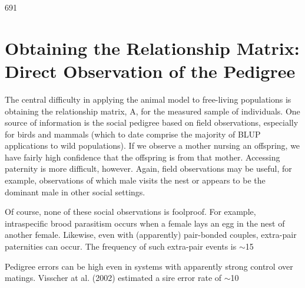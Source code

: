 \documentclass{article}
\begin{document}
691

\section{Obtaining the Relationship Matrix: Direct Observation of the Pedigree}
The central difficulty in applying the animal model to free-living populations is obtaining the relationship matrix, A, for the measured sample of individuals. One source of information is the social pedigree based on field observations, especially for birds and mammals (which to date comprise the majority of BLUP applications to wild populations). If we observe a mother nursing an offspring, we have fairly high confidence that the offspring is from that mother. Accessing paternity is more difficult, however. Again, field observations may be useful, for example, observations of which male visits the nest or appears to be the dominant male in other social settings.

Of course, none of these social observations is foolproof. For example, intraspecific brood parasitism occurs when a female lays an egg in the nest of another female. Likewise, even with (apparently) pair-bonded couples, extra-pair paternities can occur. The frequency of such extra-pair events is  $ \sim $15%

Pedigree errors can be high even in systems with apparently strong control over matings. Visscher at al. (2002) estimated a sire error rate of  $ \sim $10%
\end{document}
